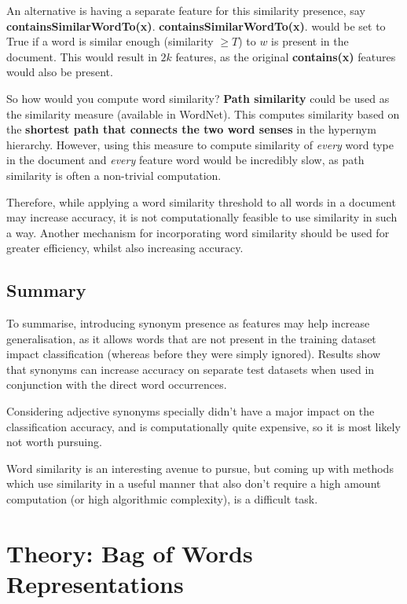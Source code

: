 \documentclass{article}
\begin{document}
An alternative is having a separate feature for this similarity presence, say \textbf{containsSimilarWordTo(x)}. \textbf{containsSimilarWordTo(x)}. would be set to True if a word is similar enough (similarity $\geq T$) to $w$ is present in the document. This would result in $2k$ features, as the original \textbf{contains(x)} features would also be present.

So how would you compute word similarity? \textbf{Path similarity} could be used as the similarity measure (available in WordNet). This computes similarity based on the \textbf{shortest path that connects the two word senses} in the hypernym hierarchy. However, using this measure to compute similarity of \textit{every} word type in the document and \textit{every} feature word would be incredibly slow, as path similarity is often a non-trivial computation.

Therefore, while applying a word similarity threshold to all words in a document may increase accuracy, it is not computationally feasible to use similarity in such a way. Another mechanism for incorporating word similarity should be used for greater efficiency, whilst also increasing accuracy.

\subsection{Summary}

To summarise, introducing synonym presence as features may help increase generalisation, as it allows words that are not present in the training dataset impact classification (whereas before they were simply ignored). Results show that synonyms can increase accuracy on separate test datasets when used in conjunction with the direct word occurrences.

Considering adjective synonyms specially didn't have a major impact on the classification accuracy, and is computationally quite expensive, so it is most likely not worth pursuing.

Word similarity is an interesting avenue to pursue, but coming up with methods which use similarity in a useful manner that also don't require a high amount computation (or high algorithmic complexity), is a difficult task.

\section{Theory: Bag of Words Representations}
\end{document}
